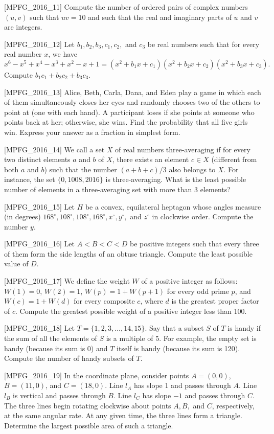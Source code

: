 [MPFG_2016_11]
Compute the number of ordered pairs of complex numbers $(u, v)$ such that $uv=10$ and such that the real and imaginary parts of $u$ and $v$ are integers.

[MPFG_2016_12]
Let $b_1, b_2, b_3, c_1, c_2,$ and $c_3$ be real numbers such that for every real number $x$, we have
$$x^6 - x^5 + x^4 - x^3 + x^2 - x + 1 = (x^2 + b_1 x + c_1)(x^2 + b_2 x + c_2)(x^2 + b_3 x + c_3).$$
Compute $b_1 c_1 + b_2 c_2 + b_3 c_3$.

[MPFG_2016_13]
Alice, Beth, Carla, Dana, and Eden play a game in which each of them simultaneously closes her eyes and randomly chooses two of the others to point at (one with each hand). A participant loses if she points at someone who points back at her; otherwise, she wins. Find the probability that all five girls win. Express your answer as a fraction in simplest form.

[MPFG_2016_14]
We call a set $X$ of real numbers three-averaging if for every two distinct elements $a$ and $b$ of $X$, there exists an element $c \in X$ (different from both $a$ and $b$) such that the number $(a+b+c)/3$ also belongs to $X$. For instance, the set $\{0, 1008, 2016\}$ is three-averaging. What is the least possible number of elements in a three-averaging set with more than 3 elements?

[MPFG_2016_15]
Let $H$ be a convex, equilateral heptagon whose angles measure (in degrees) $168^\circ, 108^\circ, 108^\circ, 168^\circ, x^\circ, y^\circ,$ and $z^\circ$ in clockwise order. Compute the number $y$.

[MPFG_2016_16]
Let $A < B < C < D$ be positive integers such that every three of them form the side lengths of an obtuse triangle. Compute the least possible value of $D$.

[MPFG_2016_17]
We define the weight $W$ of a positive integer as follows: $W(1)=0$, $W(2)=1$, $W(p)=1+W(p+1)$ for every odd prime $p$, and $W(c)=1+W(d)$ for every composite $c$, where $d$ is the greatest proper factor of $c$. Compute the greatest possible weight of a positive integer less than 100.

[MPFG_2016_18]
Let $T=\{1,2,3,\dots,14,15\}$. Say that a subset $S$ of $T$ is handy if the sum of all the elements of $S$ is a multiple of 5. For example, the empty set is handy (because its sum is 0) and $T$ itself is handy (because its sum is 120). Compute the number of handy subsets of $T$.

[MPFG_2016_19]
In the coordinate plane, consider points $A=(0,0)$, $B=(11,0)$, and $C=(18,0)$. Line $l_A$ has slope 1 and passes through $A$. Line $l_B$ is vertical and passes through $B$. Line $l_C$ has slope $-1$ and passes through $C$. The three lines begin rotating clockwise about points $A, B,$ and $C$, respectively, at the same angular rate. At any given time, the three lines form a triangle. Determine the largest possible area of such a triangle.


